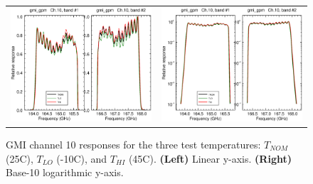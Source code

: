 \begin{figure}[htp]
  \centering
  \begin{tabular}{c c}
    \includegraphics[scale=0.3]{graphics/lin/gmi_gpm-10.eps} &
    \includegraphics[scale=0.3]{graphics/log/gmi_gpm-10.eps}
  \end{tabular}
  \caption{GMI channel 10 responses for the three test temperatures: $T_{NOM}$ (25\textdegree{}C), $T_{LO}$ (-10\textdegree{}C), and $T_{HI}$ (45\textdegree{}C). \textbf{(Left)} Linear y-axis. \textbf{(Right)} Base-10 logarithmic y-axis.}
  \label{fig:ch10_response}
\end{figure}


